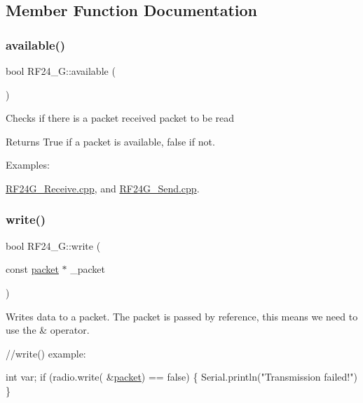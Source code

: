 \subsection{Member Function Documentation}
\hypertarget{class_r_f24___g_a7298349aea33bf12acdf242b7527302b}{}\label{class_r_f24___g_a7298349aea33bf12acdf242b7527302b} 
\subsubsection{\texorpdfstring{available()}{available()}}
{\footnotesize\ttfamily bool R\+F24\+\_\+\+G\+::available (\begin{DoxyParamCaption}{ }\end{DoxyParamCaption})}

Checks if there is a packet received packet to be read

\begin{DoxyReturn}{Returns}
True if a packet is available, false if not. 
\end{DoxyReturn}
\begin{Desc}
\item[Examples\+: ]\par
\hyperlink{_r_f24_g__receive_8cpp-example}{R\+F24\+G\+\_\+\+Receive.\+cpp}, and \hyperlink{_r_f24_g__send_8cpp-example}{R\+F24\+G\+\_\+\+Send.\+cpp}.\end{Desc}
\hypertarget{class_r_f24___g_ac10bdf625f27df73183788a6358d2e71}{}\label{class_r_f24___g_ac10bdf625f27df73183788a6358d2e71} 
\subsubsection{\texorpdfstring{write()}{write()}}
{\footnotesize\ttfamily bool R\+F24\+\_\+\+G\+::write (\begin{DoxyParamCaption}\item[{const \hyperlink{classpacket}{packet} $\ast$}]{\+\_\+packet }\end{DoxyParamCaption})}

Writes data to a packet. The packet is passed by reference, this means we need to use the \& operator.


\begin{DoxyCode}
\textcolor{comment}{//write() example:}

     \textcolor{keywordtype}{int} var;
     \textcolor{keywordflow}{if} (radio.write( &\hyperlink{classpacket}{packet}) == \textcolor{keyword}{false}) \{
         Serial.println(\textcolor{stringliteral}{"Transmission failed!"})
     \}
\end{DoxyCode}


